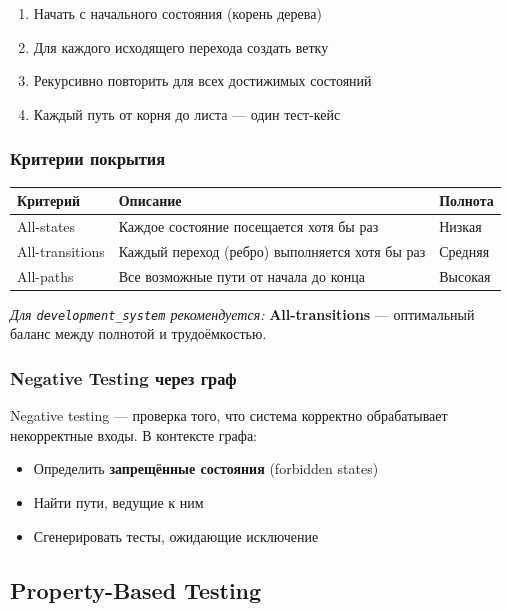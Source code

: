 \documentclass[10pt, oneside]{article}
\begin{document}
\begin{enumerate}[leftmargin=1.5em]
  \item Начать с начального состояния (корень дерева)
  \item Для каждого исходящего перехода создать ветку
  \item Рекурсивно повторить для всех достижимых состояний
  \item Каждый путь от корня до листа --- один тест-кейс
\end{enumerate}

\subsubsection{Критерии покрытия}

\begin{center}
\begin{tabularx}{\textwidth}{lLl}
  \toprule
  \textbf{Критерий} & \textbf{Описание} & \textbf{Полнота} \\
  \midrule
  All-states     & Каждое состояние посещается хотя бы раз & Низкая \\
  All-transitions & Каждый переход (ребро) выполняется хотя бы раз & Средняя \\
  All-paths      & Все возможные пути от начала до конца & Высокая \\
  \bottomrule
\end{tabularx}
\end{center}

\textit{Для \texttt{development\_system} рекомендуется:} \textbf{All-transitions} ---
оптимальный баланс между полнотой и трудоёмкостью.

\subsubsection{Negative Testing через граф}

Negative testing --- проверка того, что система корректно обрабатывает
некорректные входы. В контексте графа:

\begin{itemize}[leftmargin=1.5em]
  \item Определить \textbf{запрещённые состояния} (forbidden states)
  \item Найти пути, ведущие к ним
  \item Сгенерировать тесты, ожидающие исключение
\end{itemize}

\subsection{Property-Based Testing}
\end{document}
